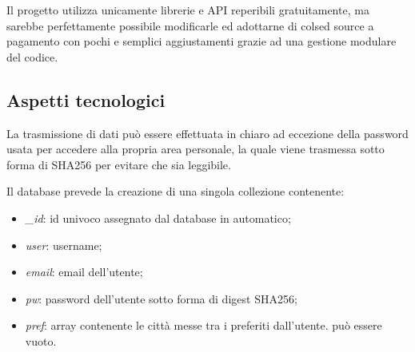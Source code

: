 \vspace{5mm}

Il progetto utilizza unicamente librerie e API reperibili gratuitamente, ma sarebbe perfettamente possibile modificarle ed 
adottarne di colsed source a pagamento con pochi e semplici aggiustamenti grazie ad una gestione modulare del codice.


\subsection{Aspetti tecnologici}

La trasmissione di dati può essere effettuata in chiaro ad eccezione della password usata per accedere alla propria area 
personale, la quale viene trasmessa sotto forma di SHA256 per evitare che sia leggibile.

\vspace{5mm}

Il database prevede la creazione di una singola collezione contenente:
\begin{itemize}
    \item \emph{\_id}: id univoco assegnato dal database in automatico;
    \item \emph{user}: username;
    \item \emph{email}: email dell'utente;
    \item \emph{pw}: password dell'utente sotto forma di digest SHA256;
    \item \emph{pref}: array contenente le città messe tra i preferiti dall'utente. può essere vuoto.
\end{itemize}

\vspace{5mm}

